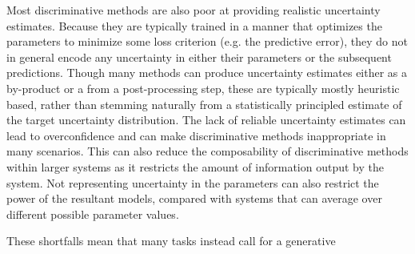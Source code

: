 Most discriminative methods are also poor at providing realistic uncertainty estimates.
Because they are typically trained in a manner that optimizes the parameters to minimize
some loss criterion (e.g. the predictive error), they do not in general encode any uncertainty
in either their parameters or the subsequent predictions.  Though many methods can
produce uncertainty estimates either as a by-product or a from a post-processing step,
these are typically mostly heuristic based, rather than stemming naturally from a statistically
principled estimate of the target uncertainty distribution.   The lack of reliable uncertainty
estimates can lead to overconfidence and can make discriminative methods inappropriate in
many scenarios.  This can also reduce the composability of discriminative methods within
larger systems as it restricts the amount of information output by the system.
Not representing uncertainty in the parameters can also restrict the power of the resultant
models, compared with systems that can average over different possible parameter values.

These shortfalls mean that many tasks instead call for a generative 

